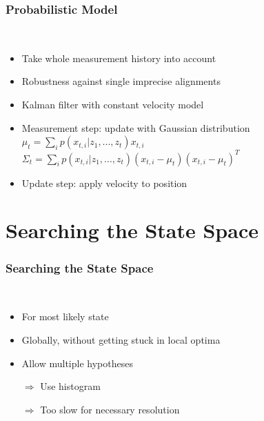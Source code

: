 \begin{frame}
  \frametitle{Probabilistic Model}
  \begin{description}[]
  \item[Motion Model] \hfill \\
  \begin{itemize}
  \item Take whole measurement history into account
  \item Robustness against single imprecise alignments
  \pause
  \item Kalman filter with constant velocity model
  \item Measurement step: update with Gaussian distribution\\
        $\mu_t=\sum_i p(x_{t,i}|z_1,...,z_t)x_{t,i}$\\
        $\Sigma_t=\sum_i p(x_{t,i}|z_1,...,z_t) (x_{t,i}-\mu_t)(x_{t,i}-\mu_t)^T$
  \item Update step: apply velocity to position
  \end{itemize}
  \end{description}
\end{frame}


\section{Searching the State Space}
\begin{frame}
  \frametitle{Searching the State Space}
  \begin{description}[]
  \item[Search the State Space] \hfill \\
  \pause
  \begin{itemize}
  \item For most likely state
  \item Globally, without getting stuck in local optima
  \item Allow multiple hypotheses
  \pause
  \item[$\Rightarrow$] Use histogram
  \pause
  \item[$\Rightarrow$] Too slow for necessary resolution
  \end{itemize}
  \end{description}
\end{frame}

